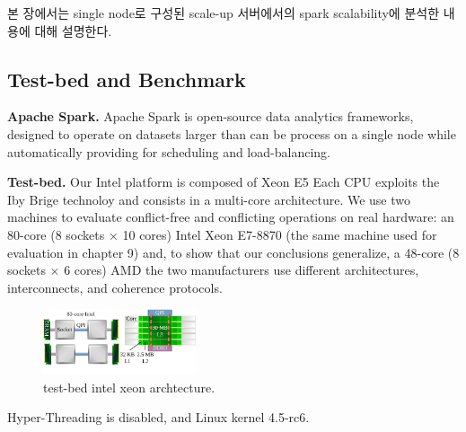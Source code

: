 \ifkor
본 장에서는 single node로 구성된 scale-up 서버에서의 spark scalability에
분석한 내용에 대해 설명한다. 
\else

\fi



\subsection{Test-bed and Benchmark}

\ifkor
\noindent
\textbf{Apache Spark. }
Apache Spark is open-source data analytics frameworks, designed to operate on
datasets larger than can be process on a single node while automatically
providing for scheduling and load-balancing.
\else

\fi

\ifkor
\noindent
\textbf{Test-bed. }
Our Intel platform is composed of Xeon E5 Each CPU exploits the Iby Brige
technoloy and consists in a multi-core architecture.
We use two machines to evaluate conflict-free and conflicting operations on real hardware: an
80-core (8 sockets × 10 cores) Intel Xeon E7-8870 (the same machine used for evaluation in
chapter 9) and, to show that our conclusions generalize, a 48-core (8 sockets × 6 cores) AMD
the two manufacturers use different architectures, interconnects, and coherence protocols.

\begin{figure}[h]
  \begin{center}
     \includegraphics[width=0.4\textwidth]{fig/xeon}
  \end{center}
  \caption{test-bed intel xeon archtecture.}
  \label{fig:basic}
\end{figure}
Hyper-Threading is disabled, and Linux kernel 4.5-rc6.
\else

